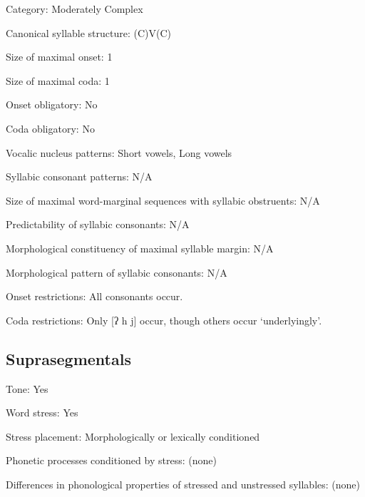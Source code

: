 {\begin{appendixdesc}
\item[Category:] Moderately Complex

\item[Canonical syllable structure:] (C)V(C) \citep[143--153]{Rice1989}

\item[Size of maximal onset:] 1

\item[Size of maximal coda:] 1

\item[Onset obligatory:] No

\item[Coda obligatory:] No

\item[Vocalic nucleus patterns:] Short vowels, Long vowels

\item[Syllabic consonant patterns:] N/A

\item[Size of maximal word-marginal sequences with syllabic obstruents:] N/A

\item[Predictability of syllabic consonants:] N/A

\item[Morphological constituency of maximal syllable margin:] N/A

\item[Morphological pattern of syllabic consonants:] N/A

\item[Onset restrictions:] All consonants occur.

\item[Coda restrictions:] Only [ʔ h j] occur, though others occur ‘underlyingly’.
\end{appendixdesc}
\subsection*{Suprasegmentals}
\begin{appendixdesc}
\item[Tone:] Yes

\item[Word stress:] Yes

\item[Stress placement:] Morphologically or lexically conditioned

\item[Phonetic processes conditioned by stress:] (none)

\item[Differences in phonological properties of stressed and unstressed syllables:] (none)


\end{appendixdesc}}
